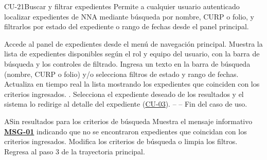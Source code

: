 \begin{UseCase}{CU-21}{Buscar y filtrar expedientes}{
	Permite a cualquier usuario autenticado localizar expedientes de NNA mediante búsqueda por nombre, CURP o folio, y filtrarlos por estado del expediente o rango de fechas desde el panel principal.
}
\end{UseCase}

\begin{UCtrayectoria}
	\UCpaso[\UCactor] Accede al panel de expedientes desde el menú de navegación principal.
	\UCpaso Muestra la lista de expedientes disponibles según el rol y equipo del usuario, con la barra de búsqueda y los controles de filtrado.
	\UCpaso[\UCactor] Ingresa un texto en la barra de búsqueda (nombre, CURP o folio) y/o selecciona filtros de estado y rango de fechas.
	\UCpaso Actualiza en tiempo real la lista mostrando los expedientes que coinciden con los criterios ingresados. .
	\UCpaso[\UCactor] Selecciona el expediente deseado de los resultados y el sistema lo redirige al detalle del expediente ({\hyperlink{CU-03}{CU-03}}).
	\UCpaso[] -- -- Fin del caso de uso.
\end{UCtrayectoria}

\begin{UCtrayectoriaA}{A}{Sin resultados para los criterios de búsqueda}
	\UCpaso Muestra el mensaje informativo \hyperlink{mMSG01}{\bf MSG-01} indicando que no se encontraron expedientes que coincidan con los criterios ingresados.
	\UCpaso[\UCactor] Modifica los criterios de búsqueda o limpia los filtros.
	\UCpaso Regresa al paso 3 de la trayectoria principal.
\end{UCtrayectoriaA}

